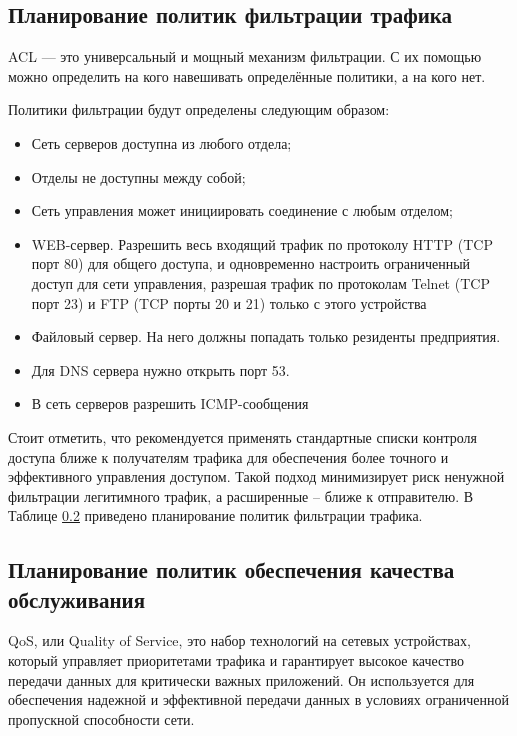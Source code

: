 \documentclass[14pt, a4paper]{extarticle}
\numberwithin{equation}{section}
\begin{document}
\subsection{Планирование политик фильтрации трафика}
ACL — это универсальный и мощный механизм фильтрации. С их помощью можно определить на 
кого навешивать определённые политики, а на кого нет.

Политики фильтрации будут определены следующим образом:
\begin{itemize}
        \item Сеть серверов доступна из любого отдела;
        \item Отделы не доступны между собой;
        \item Сеть управления может инициировать соединение
              с любым отделом;
        \item WEB-сервер. Разрешить весь входящий трафик по протоколу HTTP 
              (TCP порт 80) для общего доступа, и одновременно настроить 
              ограниченный доступ для сети управления, 
              разрешая трафик по протоколам Telnet 
              (TCP порт 23) и FTP (TCP порты 20 и 21) только с этого устройства
        \item Файловый сервер. На него должны попадать только резиденты предприятия.
        \item Для DNS сервера нужно открыть порт 53.
        \item В сеть серверов разрешить ICMP-сообщения
\end{itemize}

Стоит отметить, что рекомендуется применять стандартные списки контроля доступа 
ближе к получателям трафика для обеспечения более точного и эффективного управления доступом. 
Такой подход минимизирует риск ненужной фильтрации легитимного трафик,
а расширенные -- ближе к отправителю. В Таблице \ref{} приведено планирование
политик фильтрации трафика.


\subsection{Планирование политик обеспечения качества обслуживания}

QoS, или Quality of Service, это набор технологий на сетевых устройствах, который 
управляет приоритетами трафика и гарантирует высокое качество передачи данных для 
критически важных приложений. Он используется для обеспечения надежной и эффективной 
передачи данных в условиях ограниченной пропускной способности сети.
\end{document}
